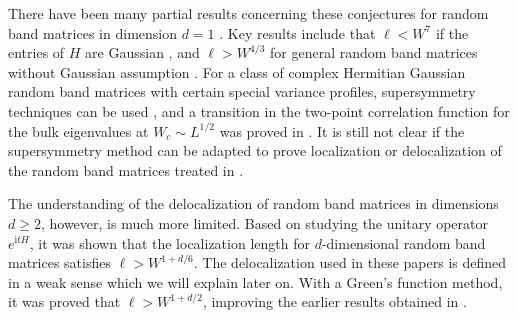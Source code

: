 \documentclass{article}
\newcommand{\1}{\mathds{1}}
\numberwithin{equation}{section}
\newcommand{\ii}{\mathrm{i}} %
\renewcommand{\geq}{\geqslant}
\renewcommand{\ge}{\geq}
\theoremstyle{plain} %
\theoremstyle{remark}
\begin{document}
There have been  many partial results concerning these conjectures for  random band matrices in dimension $d=1$ \cite{BaoErd2015,Semicircle, ErdKno2013,ErdKno2011,delocal,HeMa2018,BouErdYauYin2017,PartI,PartII,PartIII,Sch2009,PelSchShaSod,Sod2010,SchMT,Sch1,Sch2,Sch3,1Dchara,Sch2014}. Key results include that $\ell < W^7$ if the entries of $H$ are Gaussian \cite{PelSchShaSod}, and $\ell > W^{4/3}$ for general random band matrices without Gaussian assumption \cite{PartI, PartII, PartIII}. For a class of complex Hermitian Gaussian random band matrices with  certain special variance profiles, supersymmetry techniques can be used \cite{Efe1997,DisPinSpe2002,BaoErd2015,Sch2014,SchMT,Sch1,Sch2,Sch3,1Dchara}, and a transition in the two-point correlation function for the bulk eigenvalues at $W_c\sim L^{1/2}$ was proved in \cite{1Dchara}. It is still not clear if the supersymmetry method can be adapted to prove  localization or delocalization of the random band matrices treated in \cite{1Dchara}.


The understanding of the delocalization of random band matrices in dimensions $d\ge 2$, however, is much more limited.   
Based on studying the unitary operator $e^{\ii t H}$, it was shown \cite{ErdKno2013,ErdKno2011} that the localization length for 
$d$-dimensional random band matrices satisfies $\ell > W^{1+d/6}$. The delocalization used in these papers is defined in a weak sense which we will explain  later on. %
With a Green's function method, it was proved  \cite{PartIII} that $\ell > W^{1+d/2}$, improving the earlier results obtained in \cite{delocal, HeMa2018}.
\end{document}
